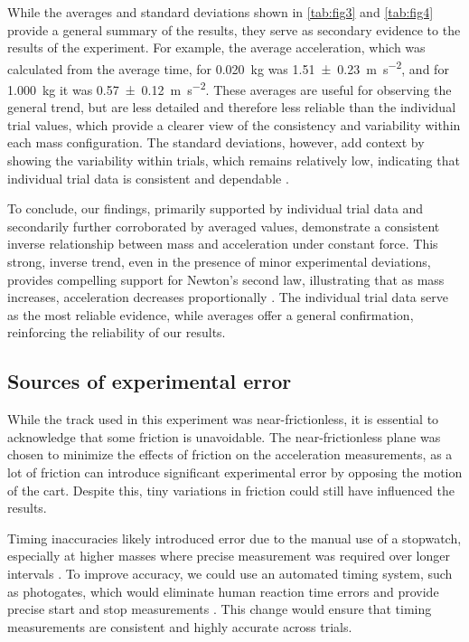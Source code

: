 ﻿\documentclass[reprint,amsmath,amssymb.aps]{revtex4-2}
\begin{document}
While the averages and standard deviations shown in \cref{tab:fig3} and \ref{tab:fig4} provide a general summary of the results, they serve as secondary evidence to the results of the experiment. For example, the average acceleration, which was calculated from the average time, for \qty{0.020}{\kilo\gram} was \qty{1.51\pm0.23}{\meter\per\second\squared}, and for \qty{1.000}{\kilo\gram} it was \qty{0.57\pm0.12}{\meter\per\second\squared}. These averages are useful for observing the general trend, but are less detailed and therefore less reliable than the individual trial values, which provide a clearer view of the consistency and variability within each mass configuration. The standard deviations, however, add context by showing the variability within trials, which remains relatively low, indicating that individual trial data is consistent and dependable \cite{starnes2015practice}.

To conclude, our findings, primarily supported by individual trial data and secondarily further corroborated by averaged values, demonstrate a consistent inverse relationship between mass and acceleration under constant force. This strong, inverse trend, even in the presence of minor experimental deviations, provides compelling support for Newton’s second law, illustrating that as mass increases, acceleration decreases proportionally \cite{knight2017physics}. The individual trial data serve as the most reliable evidence, while averages offer a general confirmation, reinforcing the reliability of our results.

\subsection{Sources of experimental error}
While the track used in this experiment was near-frictionless, it is essential to acknowledge that some friction is unavoidable. The near-frictionless plane was chosen to minimize the effects of friction on the acceleration measurements, as a lot of friction can introduce significant experimental error by opposing the motion of the cart. Despite this, tiny variations in friction could still have influenced the results.

Timing inaccuracies likely introduced error due to the manual use of a stopwatch, especially at higher masses where precise measurement was required over longer intervals \cite{hetzler2008reliability}. To improve accuracy, we could use an automated timing system, such as photogates, which would eliminate human reaction time errors and provide precise start and stop measurements \cite{taylor1997introduction}. This change would ensure that timing measurements are consistent and highly accurate across trials. 
\end{document}
